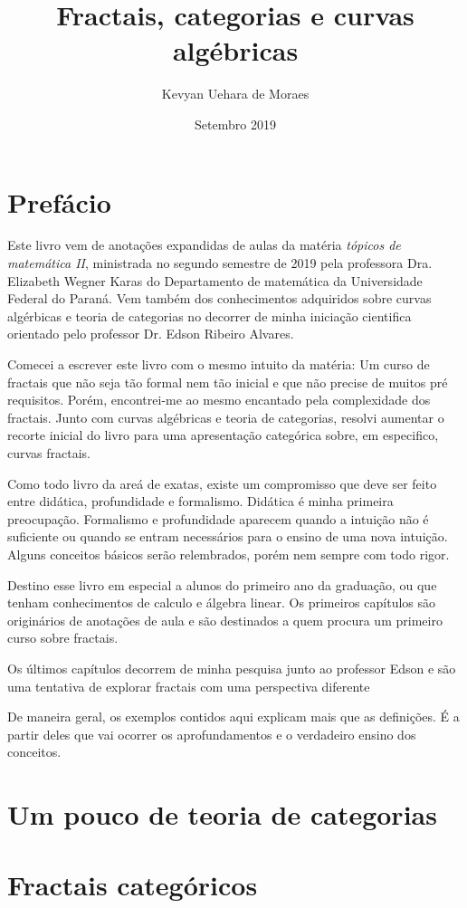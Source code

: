 \documentclass[12pt]{report}
\title{Fractais, categorias e curvas algébricas}
\author{Kevyan Uehara de Moraes}
\date{Setembro 2019}
\theoremstyle{definition}
\begin{document}
\maketitle

\chapter*{Prefácio}\label{pre}

Este livro vem de anotações expandidas de aulas da matéria \textit{tópicos de matemática II}, ministrada no segundo semestre de 2019 pela professora Dra. Elizabeth Wegner Karas do Departamento de matemática da Universidade Federal do Paraná. Vem também dos conhecimentos adquiridos sobre curvas algérbicas e teoria de categorias no decorrer de minha iniciação cientifica orientado pelo professor Dr. Edson Ribeiro Alvares. 

Comecei a escrever este livro com o mesmo intuito da matéria: Um curso de fractais que não seja tão formal nem tão inicial e que não precise de muitos pré requisitos. Porém, encontrei-me ao mesmo encantado pela complexidade dos fractais. Junto com curvas algébricas e teoria de categorias, resolvi aumentar o recorte inicial do livro para uma apresentação categórica sobre, em especifico, curvas fractais.

Como todo livro da areá de exatas, existe um compromisso que deve ser feito entre didática, profundidade e formalismo. Didática é minha primeira preocupação. Formalismo e profundidade aparecem quando a intuição não é suficiente ou quando se entram necessários para o ensino de uma nova intuição. Alguns conceitos básicos serão relembrados, porém nem sempre com todo rigor.

Destino esse livro em especial a alunos do primeiro ano da graduação, ou que tenham conhecimentos de calculo e álgebra linear. Os primeiros capítulos são originários de anotações de aula e são destinados a quem procura um primeiro curso sobre fractais.

Os últimos capítulos decorrem de minha pesquisa junto ao professor Edson e são uma tentativa de explorar fractais com uma perspectiva diferente

De maneira geral, os exemplos contidos aqui explicam mais que as definições. É a partir deles que vai ocorrer os aprofundamentos e o verdadeiro ensino dos conceitos. 

\tableofcontents







\chapter{Um pouco de teoria de categorias}

\chapter{Fractais categóricos}

\begin{appendix}
  \listoffigures
  \listoftables
\end{appendix}
\end{document}
